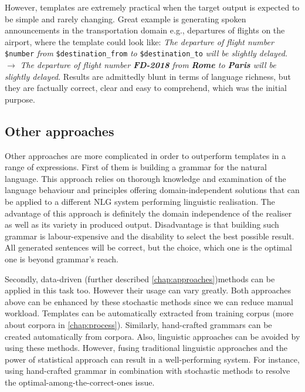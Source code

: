 However, templates are extremely practical when the target output is expected to be simple and 
rarely changing. Great example is generating spoken announcements in the transportation domain e.g., departures of flights on the airport, where the template could look like: \emph{The departure of flight number} \texttt{\$number} \textit{from} \texttt{\$destination\_from} \textit{to} \texttt{\$destination\_to} \textit{will be slightly delayed.} $\rightarrow$ \textit{The departure of flight number \textbf{FD-2018} from \textbf{Rome} to \textbf{Paris} will be slightly delayed}. Results are admittedly blunt in terms of language richness, but they are factually correct, clear and easy to comprehend, which was the initial purpose.
    
\subsection{Other approaches}
Other approaches are more complicated in order to outperform templates in a range of expressions.  First of them is building a grammar for the natural language. This approach relies on thorough knowledge and examination of the language behaviour and principles offering domain-independent solutions that can be applied to a different NLG system performing linguistic realisation. The advantage of this approach is definitely the domain independence of the realiser as well as its variety in produced output. Disadvantage is that building such grammar is labour-expensive and the disability to select the best possible result. All generated sentences will be correct, but the choice, which one is the optimal one is beyond grammar's reach.

Secondly, data-driven (further described \autoref{chap:approaches})methods can be applied in this task too. However their usage can vary greatly. Both approaches above can be enhanced by these stochastic methods since we can reduce manual workload. Templates can be automatically extracted from training corpus (more about corpora in \autoref{chap:process}). Similarly, hand-crafted grammars can be created automatically from corpora. Also, linguistic approaches can be avoided by using these methods. However, fusing traditional linguistic approaches and the power of statistical approach can result in a well-performing system. For instance, using hand-crafted grammar in combination with stochastic methods to resolve the optimal-among-the-correct-ones issue.


